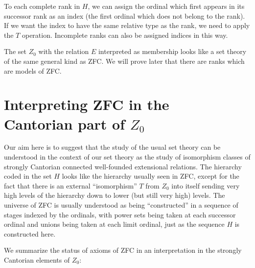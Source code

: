 \begin{definition}
 To each complete rank in $H$, we can assign the
 ordinal which first appears in its successor rank as an
 index (the first ordinal which does not belong to the rank).  If we want the
 index to have the same relative type as the rank, we
 need to apply the $T$ operation.  Incomplete ranks can also be assigned
 indices in this way.
\end{definition}

The set $Z_0$ with the relation $E$ interpreted as membership
looks like a set theory of the same general kind as
ZFC.  We will 
prove later that there are ranks which are models of ZFC.



\section[ZFC in the Cantorian part of $Z_0$]{Interpreting ZFC in the\\
 Cantorian
 part of $Z_0$}

Our aim here is to suggest that the study of the usual set theory can 
be understood in the context of our set theory as the study of
isomorphism classes of strongly
Cantorian connected well-founded 
extensional relations.  The
hierarchy coded in the set $H$ looks like 
the hierarchy usually seen in ZFC, except
for the fact that there is an external ``isomorphism'' $T$ from $Z_0$ into
itself sending very high levels of the hierarchy down to lower (but still very
high) 
levels.  The universe of ZFC is usually
understood as being 
``constructed'' in a sequence of stages indexed by
the ordinals, with 
power sets being taken at each
successor ordinal and unions being 
taken at each limit ordinal, just as the sequence $H$ is constructed
here.

We summarize the status of axioms of ZFC in
an interpretation in the strongly Cantorian elements of $Z_0$:


